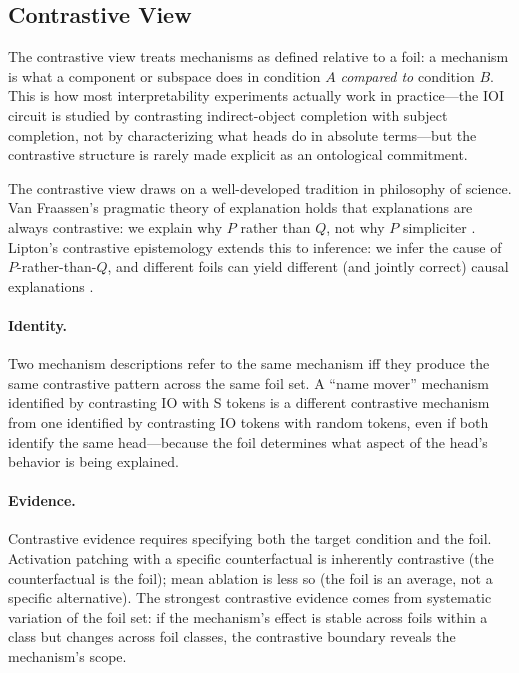 \documentclass{article}
\begin{document}
\subsection{Contrastive View}

The contrastive view treats mechanisms as defined relative to a foil:
a mechanism is what a component or subspace does in condition $A$
\emph{compared to} condition $B$.  This is how most interpretability
experiments actually work in practice---the IOI circuit is studied by
contrasting indirect-object completion with subject completion, not by
characterizing what heads do in absolute terms---but the contrastive
structure is rarely made explicit as an ontological commitment.

The contrastive view draws on a well-developed tradition in philosophy
of science.  Van Fraassen's pragmatic theory of explanation holds that
explanations are always contrastive: we explain why $P$ rather than $Q$,
not why $P$ simpliciter \citep{vanfraassen1980}.  Lipton's contrastive
epistemology extends this to inference: we infer the cause of $P$-rather-than-$Q$,
and different foils can yield different (and jointly correct) causal
explanations \citep{lipton1990}.

\paragraph{Identity.}
Two mechanism descriptions refer to the same mechanism iff they produce
the same contrastive pattern across the same foil set.  A ``name mover''
mechanism identified by contrasting IO with S tokens is a different
contrastive mechanism from one identified by contrasting IO tokens with
random tokens, even if both identify the same head---because the foil
determines what aspect of the head's behavior is being explained.

\paragraph{Evidence.}
Contrastive evidence requires specifying both the target condition and
the foil.  Activation patching with a specific counterfactual is
inherently contrastive (the counterfactual is the foil); mean ablation
is less so (the foil is an average, not a specific alternative).  The
strongest contrastive evidence comes from systematic variation of the
foil set: if the mechanism's effect is stable across foils within a
class but changes across foil classes, the contrastive boundary reveals
the mechanism's scope.
\end{document}
